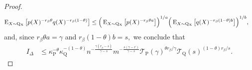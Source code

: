\documentclass[10pt,a4paper]{amsart}
\newcommand{\E}{\operatorname{E}}
\renewcommand{\P}{\operatorname{P}}
\newcommand{\Q}{\operatorname{Q}}
\renewcommand{\k}{\kappa}
\newcommand{\mT}{\mathcal{T}}
\newcommand{\sX}{\mathrm{X}}
\begin{document}
\begin{proof}
    \begin{align*}
        \E_{X \sim \Q\mathstrut_{\!\sX}}\big[p(X)^{-r_\beta \theta}q(X)^{-r_\beta(1 - \theta)}\big] &\leq \Big(\E_{X \sim \Q\mathstrut_{\!\sX}}\big[p(X)^{-r_\beta \theta a}\big]\Big)^{1/a}\Big(\E_{X \sim \Q\mathstrut_{\!\sX}}\big[q(X)^{-r_\beta(1 - \theta)b}\big]\Big)^{1/b},
    \end{align*}
    and, since $r_\beta\theta a = \gamma$ and $r_\beta(1 - \theta)b = s,$ we conclude that
    \begin{align*}
        I_{\Delta} &\leq \k_{\P}^{-\theta}\k_{\Q}^{-(1 - \theta)}n^{-\tfrac{\gamma(r_\beta - s)}{\gamma - s}}m^{-\tfrac{s(\gamma - r)}{\gamma - s}}\mT_{\P}(\gamma)^{\theta r_\beta/\gamma} \mT_{\Q}(s)^{(1 - \theta)r_\beta/s}.
    \end{align*}
    

\end{proof}
\end{document}
